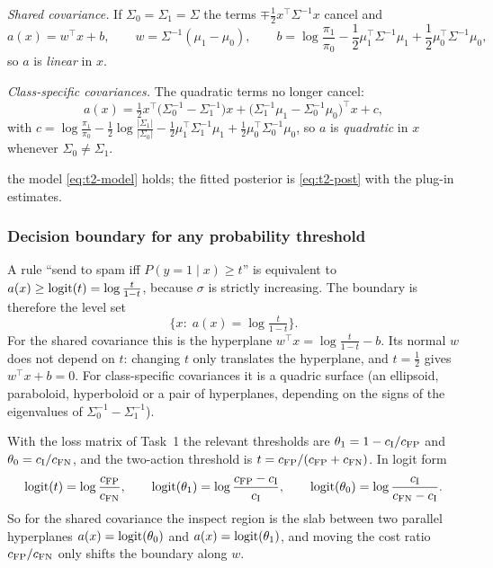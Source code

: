 \emph{Shared covariance.} If $\Sigma_0=\Sigma_1=\Sigma$ the terms $\mp\frac12x^{\top}\Sigma^{-1}x$ cancel and
\begin{equation}
  a(x)=w^{\top}x+b,\qquad
  w=\Sigma^{-1}(\mu_1-\mu_0),\qquad
  b=\log\frac{\pi_1}{\pi_0}-\frac12\mu_1^{\top}\Sigma^{-1}\mu_1+\frac12\mu_0^{\top}\Sigma^{-1}\mu_0 ,
  \label{eq:t2-linear}
\end{equation}
so $a$ is \emph{linear} in $x$.

\emph{Class-specific covariances.} The quadratic terms no longer cancel:
\begin{equation}
  a(x)=\tfrac12x^{\top}\bigl(\Sigma_0^{-1}-\Sigma_1^{-1}\bigr)x
      +\bigl(\Sigma_1^{-1}\mu_1-\Sigma_0^{-1}\mu_0\bigr)^{\top}x+c,
  \label{eq:t2-quad}
\end{equation}
with $c=\log\frac{\pi_1}{\pi_0}-\frac12\log\frac{|\Sigma_1|}{|\Sigma_0|}
-\frac12\mu_1^{\top}\Sigma_1^{-1}\mu_1+\frac12\mu_0^{\top}\Sigma_0^{-1}\mu_0$, so $a$ is \emph{quadratic}
in $x$ whenever $\Sigma_0\neq\Sigma_1$.

\begin{assumptions}
the model \eqref{eq:t2-model} holds; the fitted posterior is \eqref{eq:t2-post}
with the plug-in estimates.
\end{assumptions}

\subsubsection{Decision boundary for any probability threshold}
A rule ``send to spam iff $P(y=1\mid x)\ge t$'' is equivalent to $a(x)\ge\operatorname{logit}(t)=\log\frac{t}{1-t}$,
because $\sigma$ is strictly increasing. The boundary is therefore the level set
\begin{equation}
  \{x:\;a(x)=\log\tfrac{t}{1-t}\}.
  \label{eq:t2-boundary}
\end{equation}
For the shared covariance this is the hyperplane $w^{\top}x=\log\frac{t}{1-t}-b$. Its normal $w$ does not
depend on $t$: changing $t$ only translates the hyperplane, and $t=\frac12$ gives $w^{\top}x+b=0$. For
class-specific covariances it is a quadric surface (an ellipsoid, paraboloid, hyperboloid or a pair of
hyperplanes, depending on the signs of the eigenvalues of $\Sigma_0^{-1}-\Sigma_1^{-1}$).

With the loss matrix of Task~1 the relevant thresholds are $\theta_1=1-c_{\mathrm{I}}/c_{\mathrm{FP}}$ and $\theta_0=c_{\mathrm{I}}/c_{\mathrm{FN}}$,
and the two-action threshold is $t=c_{\mathrm{FP}}/(c_{\mathrm{FP}}+c_{\mathrm{FN}})$. In logit form
\begin{equation}
  \operatorname{logit}(t)=\log\frac{c_{\mathrm{FP}}}{c_{\mathrm{FN}}},\qquad
  \operatorname{logit}(\theta_1)=\log\frac{c_{\mathrm{FP}}-c_{\mathrm{I}}}{c_{\mathrm{I}}},\qquad
  \operatorname{logit}(\theta_0)=\log\frac{c_{\mathrm{I}}}{c_{\mathrm{FN}}-c_{\mathrm{I}}}.
  \label{eq:t2-logit-thresholds}
\end{equation}
So for the shared covariance the inspect region is the slab between two parallel hyperplanes
$a(x)=\operatorname{logit}(\theta_0)$ and $a(x)=\operatorname{logit}(\theta_1)$, and moving the cost ratio $c_{\mathrm{FP}}/c_{\mathrm{FN}}$ only shifts the
boundary along $w$.

